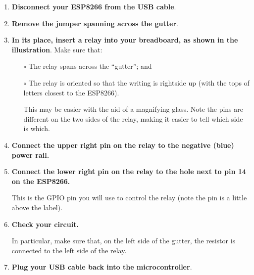 \begin{enumerate}
	\item \textbf{Disconnect your ESP8266 from the USB cable}.

	\item \textbf{Remove the jumper spanning across the gutter}. 
	
	\item \textbf{In its place, insert a relay into your breadboard, as shown in the illustration}.
	Make sure that: 
	\begin{itemize}
		\item[$\circ$] The relay spans across the ``gutter''; and
		\item[$\circ$] The relay is oriented so that the writing is rightside up (with the tops of letters closest to the ESP8266).
		
		This may be easier with the aid of a magnifying glass. Note the pins are different on the two sides of the relay, making it easier to tell which side is which.
	\end{itemize}
	
	\item \textbf{Connect the upper right pin on the relay to the negative (blue) power rail.}
	
	\item \textbf{Connect the lower right pin on the relay to the hole next to pin 14 on the ESP8266.} 
	
	This is the GPIO pin you will use to control the relay (note the pin is a little above the label).
	
%	
%	

	\item \textbf{Check your circuit.}	
	
	In particular, make sure that, on the left side of the gutter, the resistor is connected to the left side of the relay.

	\item \textbf{Plug your USB cable back into the microcontroller}.
\end{enumerate}

